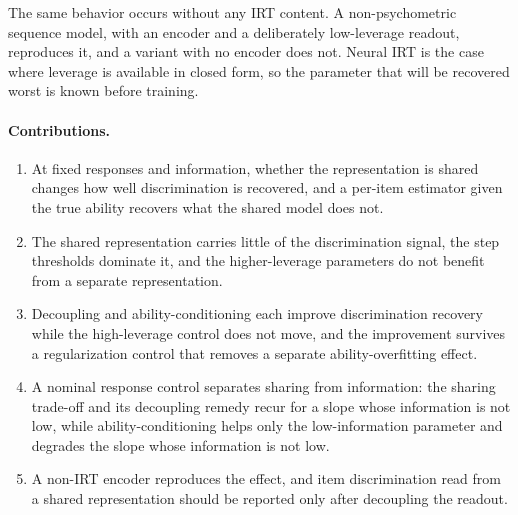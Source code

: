 \documentclass[twocolumn,10pt]{article}
\begin{document}
The same behavior occurs without any IRT content. A non-psychometric sequence model, with
an encoder and a deliberately low-leverage readout, reproduces it, and a variant with no
encoder does not. Neural IRT is the case where leverage is available in closed form, so
the parameter that will be recovered worst is known before training.

\paragraph{Contributions.}
\begin{enumerate}\itemsep1pt
\item At fixed responses and information, whether the representation is shared changes how
well discrimination is recovered, and a per-item estimator given the true ability recovers
what the shared model does not.
\item The shared representation carries little of the discrimination signal, the step
thresholds dominate it, and the higher-leverage parameters do not benefit from a separate
representation.
\item Decoupling and ability-conditioning each improve discrimination recovery while the
high-leverage control does not move, and the improvement survives a regularization control
that removes a separate ability-overfitting effect.
\item A nominal response control separates sharing from information: the sharing trade-off
and its decoupling remedy recur for a slope whose information is not low, while
ability-conditioning helps only the low-information parameter and degrades the slope whose
information is not low.
\item A non-IRT encoder reproduces the effect, and item discrimination read from a shared
representation should be reported only after decoupling the readout.
\end{enumerate}
\end{document}
